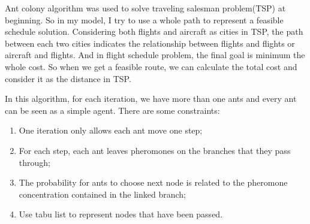 \documentclass[senior]{IPSstyle}
\begin{document}
Ant colony algorithm  was used to solve traveling salesman problem(TSP) at beginning. 
So in my model, I try to use a whole path to represent a feasible schedule solution. 
Considering both flights and aircraft as cities in TSP, the path between each two cities indicates the relationship between flights and flights or aircraft and flights. 
And in flight schedule problem, the final goal is minimum the whole cost. So when we get a feasible route, we can calculate the total cost and consider it as the distance in TSP.

In this algorithm, for each iteration, we have more than one ants and every ant can be seen as a simple agent. There are some constraints:
\begin{enumerate}
    \item One iteration only allows each ant move one step;
    \item For each step, each ant leaves pheromones on the branches that they pass through;
    \item The probability for ants to choose next node is related to the pheromone concentration contained in the linked branch;
    \item Use tabu list to represent nodes that have been passed.
\end{enumerate}
\end{document}
